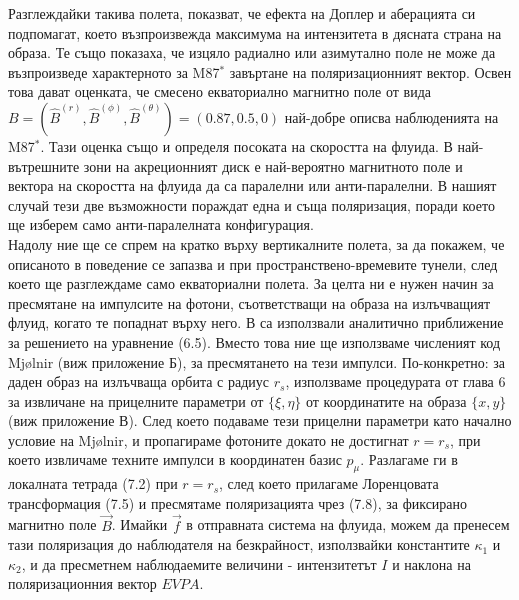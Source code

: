 Разглеждайки такива полета, \cite{Narayan2021} показват, че ефекта на Доплер и аберацията си подпомагат, което възпроизвежда максимума на интензитета в дясната страна на образа. Те също показаха, че изцяло радиално или азимутално поле не може да възпроизведе характерното за M87$^*$ завъртане на поляризационният вектор. Освен това дават оценката, че смесено екваториално магнитно поле от вида $B = (\hat{B}^{(r)},\hat{B}^{(\phi)},\hat{B}^{(\theta)}) = (0.87,0.5,0)$ най-добре описва наблюденията на M87$^*$. Тази оценка също и определя посоката на скоростта на флуида. В най-вътрешните зони на акреционният диск е най-вероятно магнитното поле и вектора на скоростта на флуида да са паралелни или анти-паралелни. В нашият случай тези две възможности пораждат една и съща поляризация, поради което ще изберем само анти-паралелната конфигурация.\\

Надолу ние ще се спрем на кратко върху вертикалните полета, за да покажем, че описаното в \cite{Narayan2021} поведение се запазва и при пространствено-времевите тунели, след което ще разглеждаме само екваториални полета. За целта ни е нужен начин за пресмятане на импулсите на фотони, съответстващи на образа на излъчващият флуид, когато те попаднат върху него. В \cite{Narayan2021} са използвали аналитично приближение за решението на уравнение (6.5). Вместо това ние ще използваме численият код Mjølnir (виж приложение Б), за пресмятането на тези импулси. По-конкретно: за даден образ на излъчваща орбита с радиус $r_s$, използваме процедурата от глава 6 за извличане на прицелните параметри от $\{\xi,\eta\}$ от координатите на образа $\{x, y\}$ (виж приложение В). След което подаваме тези прицелни параметри като начално условие на Mjølnir, и пропагираме фотоните докато не достигнат $r = r_s$, при което извличаме техните импулси в координатен базис $p_\mu$. Разлагаме ги в локалната тетрада (7.2) при $r = r_s$, след което прилагаме Лоренцовата трансформация (7.5) и пресмятаме поляризацията чрез (7.8), за фиксирано магнитно поле $\vec{B}$. Имайки $\vec{f}$ в отправната система на флуида, можем да пренесем тази поляризация до наблюдателя на безкрайност, използвайки константите $\kappa_1$ и $\kappa_2$, и да пресметнем наблюдаемите величини - интензитетът $I$ и наклона на поляризационния вектор $EVPA$.
